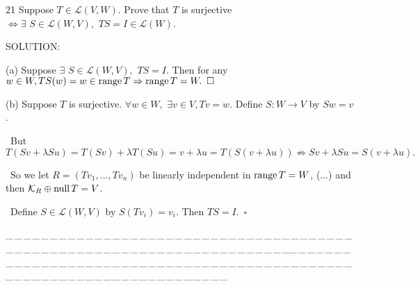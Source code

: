 \documentclass[a4paper, 11pt, UTF8]{article}
\def\range{\textup{range}\,}
\def\null{\textup{null\,}}
\def\Lm{\mathcal{L}}
\begin{document}
\begin{large}
{\timesbf\Large 21} {\timessl\Large 
Suppose $T\in\Lm(V, W)$. Prove that $T$ is surjective $\Longleftrightarrow\exists\,\,S\in\Lm(W, V),\,\,TS=I\in\Lm(W)$.}\par
{\timesbf S\footnotesize{OLUTION:}}\par\quad
(a) Suppose $\exists\,\,S\in\Lm(W, V),\,\,TS=I$. Then for any $w\in W,TS(w)=w\in\range T\Rightarrow \range T=W.\,\,\,\square$\par\quad
(b) Suppose $T$ is surjective. $\forall w\in W,\,\,\exists v\in V,Tv=w.$ Define $S:W\rightarrow V$ by $Sw=v$.\par\qquad\,
But $T(Sv+\lambda Su)=T(Sv)+\lambda T(Su)=v+\lambda u=T(S(v+\lambda u))\not\Rightarrow Sv+\lambda Su=S(v+\lambda u).$\par\qquad\,
So we let $R=(Tv_1,\dots,Tv_n)$ be linearly independent in $\range T=W$, ($\dots$) and then $\mathcal{K}_R\oplus\null T=V$.\par\qquad\,
Define $S\in\Lm(W,V)$ by $S(Tv_i)=v_i.$ Then $TS=I.\,\,\,\square$\par
{\tiny \_\,\_\,\_\,\_\,\_\,\_\,\_\,\_\,\_\,\_\,\_\,\_\,\_\,\_\,\_\,\_\,\_\,\_\,\_\,\_\,\_\,\_\,\_\,\_\,\_\,\_\,\_\,\_\,\_\,\_\,\_\,\_\,\_\,\_\,\_\,\_\,\_\,\_\,\_\,\_\,\_\,\_\,\_\,\_\,\_\,\_\,\_\,\_\,\_\,\_\,\_\,\_\,\_\,\_\,\_\,\_\,\_\,\_\,\_\,\_\,\_\,\_\,\_\,\_\,\_\,\_\,\_\,\_\,\_\,\_\,\_\_\,\_\,\_\,\_\,\_\,\_\,\_\,\_\,\_\,\_\,\_\,\_\,\_\,\_\,\_\,\_\,\_\,\_\,\_\,\_\,\_\,\_\,\_\,\_\,\_\,\_\,\_\,\_\,\_\,\_\,\_\,\_\,\_\,\_\,\_\,\_\,\_\,\_\,\_\,\_\,\_\,\_\,\_\,\_\,\_\,\_\,\_\,\_\,\_\,\_\,\_\,\_\,\_\,\_\,\_\,\_\,\_\,\_\,\_\,\_\,\_\,\_\,\_\,\_\,\_\,\_\,\_\,\_\,\_\,\_\,\_}\par


\end{large}
\end{document}
